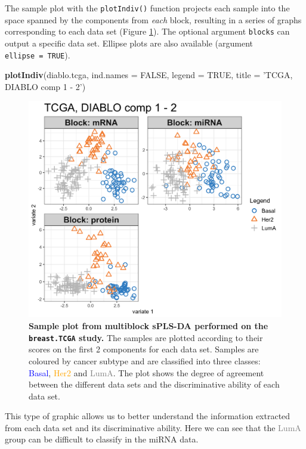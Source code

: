\documentclass[]{book}
\newenvironment{Shaded}{\begin{snugshade}}{\end{snugshade}}
\newcommand{\KeywordTok}[1]{\textcolor[rgb]{0.13,0.29,0.53}{\textbf{#1}}}
\newcommand{\DataTypeTok}[1]{\textcolor[rgb]{0.13,0.29,0.53}{#1}}
\newcommand{\StringTok}[1]{\textcolor[rgb]{0.31,0.60,0.02}{#1}}
\newcommand{\OtherTok}[1]{\textcolor[rgb]{0.56,0.35,0.01}{#1}}
\newcommand{\NormalTok}[1]{#1}
\begin{document}
The sample plot with the \texttt{plotIndiv()} function projects each
sample into the space spanned by the components from \emph{each} block,
resulting in a series of graphs corresponding to each data set (Figure
\ref{fig:diablo-plotindiv}). The optional argument \texttt{blocks} can
output a specific data set. Ellipse plots are also available (argument
\texttt{ellipse\ =\ TRUE}).

\begin{Shaded}
\begin{Highlighting}[]
\KeywordTok{plotIndiv}\NormalTok{(diablo.tcga, }\DataTypeTok{ind.names =} \OtherTok{FALSE}\NormalTok{, }\DataTypeTok{legend =} \OtherTok{TRUE}\NormalTok{, }
          \DataTypeTok{title =} \StringTok{'TCGA, DIABLO comp 1 - 2'}\NormalTok{)}
\end{Highlighting}
\end{Shaded}

\begin{figure}

{\centering \includegraphics[width=0.5\linewidth]{Figures/DIABLO/diablo-plotindiv-1} 

}

\caption{\textbf{Sample plot from multiblock sPLS-DA
performed on the \texttt{breast.TCGA} study.} The samples are plotted
according to their scores on the first 2 components for each data set.
Samples are coloured by cancer subtype and are classified into three
classes: \textcolor{blue}{Basal}, \textcolor{orange}{Her2} and
\textcolor{grey}{LumA}. The plot shows the degree of agreement between
the different data sets and the discriminative ability of each data set.}\label{fig:diablo-plotindiv}
\end{figure}









This type of graphic allows us to better understand the information
extracted from each data set and its discriminative ability. Here we can
see that the \textcolor{grey}{LumA} group can be difficult to classify
in the miRNA data.
\end{document}
